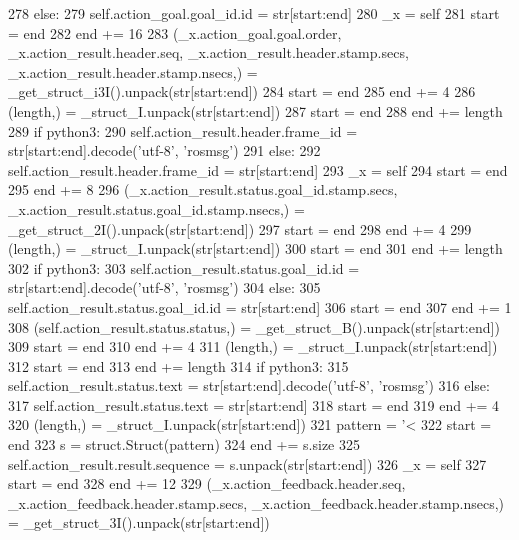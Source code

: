 \begin{DoxyCode}
278       \textcolor{keywordflow}{else}:
279         self.action\_goal.goal\_id.id = str[start:end]
280       \_x = self
281       start = end
282       end += 16
283       (\_x.action\_goal.goal.order, \_x.action\_result.header.seq, \_x.action\_result.header.stamp.secs, 
      \_x.action\_result.header.stamp.nsecs,) = \_get\_struct\_i3I().unpack(str[start:end])
284       start = end
285       end += 4
286       (length,) = \_struct\_I.unpack(str[start:end])
287       start = end
288       end += length
289       \textcolor{keywordflow}{if} python3:
290         self.action\_result.header.frame\_id = str[start:end].decode(\textcolor{stringliteral}{'utf-8'}, \textcolor{stringliteral}{'rosmsg'})
291       \textcolor{keywordflow}{else}:
292         self.action\_result.header.frame\_id = str[start:end]
293       \_x = self
294       start = end
295       end += 8
296       (\_x.action\_result.status.goal\_id.stamp.secs, \_x.action\_result.status.goal\_id.stamp.nsecs,) = 
      \_get\_struct\_2I().unpack(str[start:end])
297       start = end
298       end += 4
299       (length,) = \_struct\_I.unpack(str[start:end])
300       start = end
301       end += length
302       \textcolor{keywordflow}{if} python3:
303         self.action\_result.status.goal\_id.id = str[start:end].decode(\textcolor{stringliteral}{'utf-8'}, \textcolor{stringliteral}{'rosmsg'})
304       \textcolor{keywordflow}{else}:
305         self.action\_result.status.goal\_id.id = str[start:end]
306       start = end
307       end += 1
308       (self.action\_result.status.status,) = \_get\_struct\_B().unpack(str[start:end])
309       start = end
310       end += 4
311       (length,) = \_struct\_I.unpack(str[start:end])
312       start = end
313       end += length
314       \textcolor{keywordflow}{if} python3:
315         self.action\_result.status.text = str[start:end].decode(\textcolor{stringliteral}{'utf-8'}, \textcolor{stringliteral}{'rosmsg'})
316       \textcolor{keywordflow}{else}:
317         self.action\_result.status.text = str[start:end]
318       start = end
319       end += 4
320       (length,) = \_struct\_I.unpack(str[start:end])
321       pattern = \textcolor{stringliteral}{'<%
322       start = end
323       s = struct.Struct(pattern)
324       end += s.size
325       self.action\_result.result.sequence = s.unpack(str[start:end])
326       \_x = self
327       start = end
328       end += 12
329       (\_x.action\_feedback.header.seq, \_x.action\_feedback.header.stamp.secs, 
      \_x.action\_feedback.header.stamp.nsecs,) = \_get\_struct\_3I().unpack(str[start:end])
}
\end{DoxyCode}
